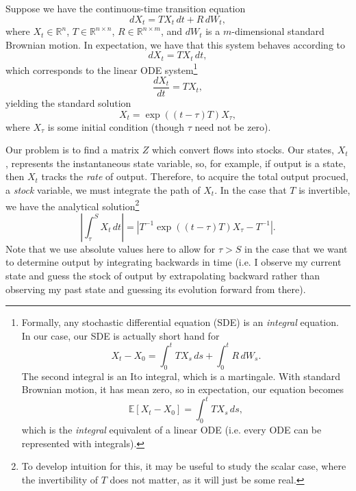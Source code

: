 \documentclass[12 pt, oneside]{article}
\theoremstyle{definition}
\theoremstyle{definition}
\theoremstyle{definition}
\newcommand{\R}{\mathbb{R}}
\newcommand{\E}{\mathbb{E}}
\begin{document}
Suppose we have the continuous-time transition equation
\[dX_t = TX_t\,dt + R\, dW_t,  \]
where $X_t\in \R^n$, $T\in \R^{n\times n}$, $R\in \R^{n\times m}$, and $dW_t$ is a $m$-dimensional standard Brownian motion. In expectation, we have that this system behaves according to
\[ dX_t = TX_t\,dt, \]
which corresponds to the linear ODE system\footnote{Formally, any stochastic differential equation (SDE) is an \textit{integral} equation. In our case, our SDE is actually short hand for
\[X_t - X_0 = \int_0^t TX_s\, ds + \int_0^t R\, dW_s.  \]
The second integral is an Ito integral, which is a martingale. With standard Brownian motion, it has mean zero, so in expectation, our equation becomes
\[\E[X_t - X_0] = \int_0^t TX_s\,ds,  \]
which is the \textit{integral} equivalent of a linear ODE (i.e. every ODE can be represented with integrals).
}
\[ \dfrac{dX_t}{dt} = TX_t, \]
yielding the standard solution
\[ X_t = \exp((t-\tau)T)X_\tau, \]
where $X_\tau$ is some initial condition (though $\tau$ need not be zero).

Our problem is to find a matrix $Z$ which convert flows into stocks. Our states, $X_t$, represents the instantaneous state variable, so, for example, if output is a state, then $X_t$ tracks the \textit{rate} of output. Therefore, to acquire the total output procued, a \textit{stock} variable, we must integrate the path of $X_t$. In the case that $T$ is invertible, we have the analytical solution\footnote{To develop intuition for this, it may be useful to study the scalar case, where the invertibility of $T$ does not matter, as it will just be some real.}
\[\left| \int_\tau^S X_t\, dt\right| = \left|T^{-1}\exp((t-\tau)T)X_\tau - T^{-1}\right|. \]
Note that we use absolute values here to allow for $\tau > S$ in the case that we want to determine output by integrating backwards in time (i.e. I observe my current state and guess the stock of output by extrapolating backward rather than observing my past state and guessing its evolution forward from there).
\end{document}
